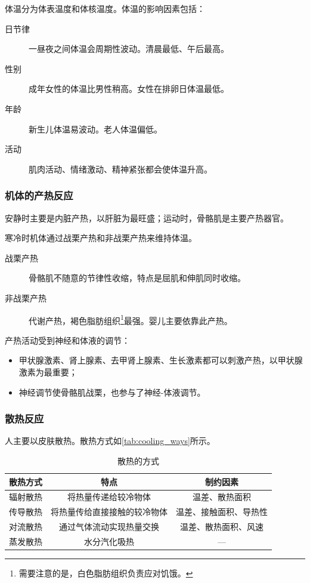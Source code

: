 体温分为体表温度和体核温度。体温的影响因素包括：
\begin{description}
	\item[日节律] 一昼夜之间体温会周期性波动。清晨最低、午后最高。
	\item[性别] 成年女性的体温比男性稍高。女性在排卵日体温最低。
	\item[年龄] 新生儿体温易波动。老人体温偏低。
	\item[活动] 肌肉活动、情绪激动、精神紧张都会使体温升高。
\end{description}

\subsubsection{机体的产热反应}

安静时主要是内脏产热，以肝脏为最旺盛；运动时，骨骼肌是主要产热器官。

寒冷时机体通过战栗产热和非战栗产热来维持体温。
\begin{description}
	\item[战栗产热] 骨骼肌不随意的节律性收缩，特点是屈肌和伸肌同时收缩。
	\item[非战栗产热] 代谢产热，褐色脂肪组织\footnote{需要注意的是，白色脂肪组织负责应对饥饿。}最强。婴儿主要依靠此产热。
\end{description}

产热活动受到神经和体液的调节：
\begin{itemize}
	\item 甲状腺激素、肾上腺素、去甲肾上腺素、生长激素都可以刺激产热，以甲状腺激素为最重要；
	\item 神经调节使骨骼肌战栗，也参与了神经-体液调节。
\end{itemize}

\subsubsection{散热反应}

人主要以皮肤散热。散热方式如\autoref{tab:cooling_ways}所示。

\begin{table}[htbp]
	\centering
	\begin{tabularx}{\textwidth}{|c|C|C|}
		\hline
		散热方式 & 特点 & 制约因素 \\ \hline
		辐射散热 & 将热量传递给较冷物体 & 温差、散热面积 \\ \hline
		传导散热 & 将热量传给直接接触的较冷物体 & 温差、接触面积、导热性 \\ \hline
		对流散热 & 通过气体流动实现热量交换 & 温差、散热面积、风速 \\ \hline
		蒸发散热 & 水分汽化吸热 & --- \\ \hline
	\end{tabularx}
	\caption{散热的方式}
	\label{tab:cooling_ways}
\end{table}

